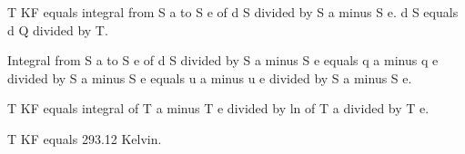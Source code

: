 T KF equals integral from S a to S e of d S divided by S a minus S e.  
d S equals d Q divided by T.  

Integral from S a to S e of d S divided by S a minus S e equals q a minus q e divided by S a minus S e equals u a minus u e divided by S a minus S e.  

T KF equals integral of T a minus T e divided by ln of T a divided by T e.  

T KF equals 293.12 Kelvin.